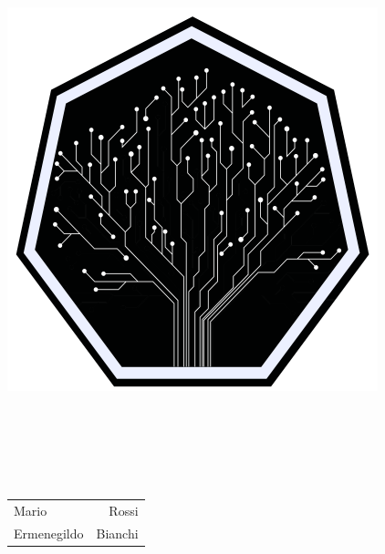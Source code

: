 
\begin{titlepage}
	\begin{center}
		\includegraphics[scale=0.9]{img/logo} \\ %
		\vspace{1cm} %
		
		{\LARGE \DocAuthor} \\ %
		\vspace{0.5cm} %
		
		{\Huge \textbf{\DocTitle}} \\ %
		\vspace{0.5cm}
		
		\DocDate \\ %
		\vspace{1cm}
		
		
		\begin{tabular}{l | r} 
			Mario        & Rossi \\    %
			Ermenegildo	 & Bianchi \\  %
		\end{tabular}
		
		
	\end{center}
\end{titlepage}
\clearpage

